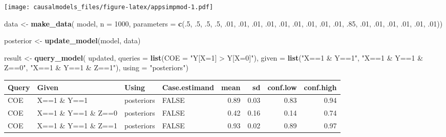 \documentclass[
  12pt,
]{book}
\newenvironment{Shaded}{\begin{snugshade}}{\end{snugshade}}
\newcommand{\AttributeTok}[1]{\textcolor[rgb]{0.13,0.29,0.53}{#1}}
\newcommand{\DecValTok}[1]{\textcolor[rgb]{0.00,0.00,0.81}{#1}}
\newcommand{\FunctionTok}[1]{\textcolor[rgb]{0.13,0.29,0.53}{\textbf{#1}}}
\newcommand{\NormalTok}[1]{#1}
\newcommand{\OtherTok}[1]{\textcolor[rgb]{0.56,0.35,0.01}{#1}}
\newcommand{\StringTok}[1]{\textcolor[rgb]{0.31,0.60,0.02}{#1}}
\begin{document}
\texttt{[image: causalmodels\_files/figure-latex/appsimpmod-1.pdf]}

\begin{Shaded}
\begin{Highlighting}[]
\NormalTok{data }\OtherTok{\textless{}{-}} \FunctionTok{make\_data}\NormalTok{(}
\NormalTok{    model, }\AttributeTok{n =} \DecValTok{1000}\NormalTok{, }
    \AttributeTok{parameters =} \FunctionTok{c}\NormalTok{(.}\DecValTok{5}\NormalTok{, .}\DecValTok{5}\NormalTok{, .}\DecValTok{5}\NormalTok{, .}\DecValTok{5}\NormalTok{, }
\NormalTok{                   .}\DecValTok{01}\NormalTok{, .}\DecValTok{01}\NormalTok{, .}\DecValTok{01}\NormalTok{, .}\DecValTok{01}\NormalTok{, .}\DecValTok{01}\NormalTok{, .}\DecValTok{01}\NormalTok{, .}\DecValTok{01}\NormalTok{, .}\DecValTok{01}\NormalTok{,}
\NormalTok{                   .}\DecValTok{01}\NormalTok{, .}\DecValTok{85}\NormalTok{, .}\DecValTok{01}\NormalTok{, .}\DecValTok{01}\NormalTok{, .}\DecValTok{01}\NormalTok{, .}\DecValTok{01}\NormalTok{, .}\DecValTok{01}\NormalTok{, .}\DecValTok{01}\NormalTok{))}
\end{Highlighting}
\end{Shaded}

\begin{Shaded}
\begin{Highlighting}[]
\NormalTok{posterior }\OtherTok{\textless{}{-}} \FunctionTok{update\_model}\NormalTok{(model, data)}
\end{Highlighting}
\end{Shaded}

\begin{Shaded}
\begin{Highlighting}[]
\NormalTok{result }\OtherTok{\textless{}{-}} \FunctionTok{query\_model}\NormalTok{(}
\NormalTok{    updated, }
    \AttributeTok{queries =} \FunctionTok{list}\NormalTok{(}\AttributeTok{COE =} \StringTok{"Y[X=1] \textgreater{} Y[X=0]"}\NormalTok{), }
    \AttributeTok{given =} \FunctionTok{list}\NormalTok{(}\StringTok{"X==1 \& Y==1"}\NormalTok{, }\StringTok{"X==1 \& Y==1 \& Z==0"}\NormalTok{, }\StringTok{"X==1 \& Y==1 \& Z==1"}\NormalTok{),}
    \AttributeTok{using =} \StringTok{"posteriors"}\NormalTok{)}
\end{Highlighting}
\end{Shaded}

\begin{tabular}{l|l|l|l|r|r|r|r}
\hline
Query & Given & Using & Case.estimand & mean & sd & conf.low & conf.high\\
\hline
COE & X==1 \& Y==1 & posteriors & FALSE & 0.89 & 0.03 & 0.83 & 0.94\\
\hline
COE & X==1 \& Y==1 \& Z==0 & posteriors & FALSE & 0.42 & 0.16 & 0.14 & 0.74\\
\hline
COE & X==1 \& Y==1 \& Z==1 & posteriors & FALSE & 0.93 & 0.02 & 0.89 & 0.97\\
\hline
\end{tabular}
\end{document}
